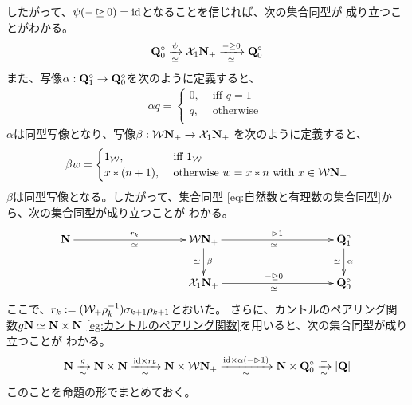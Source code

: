 	したがって、$\psi(-\unrhd0)=\id$となることを信じれば、次の集合同型が
	成り立つことがわかる。
	\begin{equation*}\begin{split}
		\bunsub[0] \xto[\simeq]{\psi} \mycal{X}_1\sizen_+\xto[\simeq]{-\unrhd0} \bunsub[0]
	\end{split}\end{equation*}
	また、写像$\alpha:\bunsub[1]\to\bunsub[0]$を次のように定義すると、
	\begin{equation*}\begin{split}
		\alpha q = \begin{cases}
			0, &\text{ iff } q = 1 \\
			q, &\text{ otherwise } \\
		\end{cases}
	\end{split}\end{equation*}
	$\alpha$は同型写像となり、写像$\beta:\Word\sizen_+\to\mycal{X}_1\sizen_+$
	を次のように定義すると、
	\begin{equation*}\begin{split}
		\beta w = \begin{cases}
			1_\Word, &\text{ iff } 1_\Word \\
			x * (n + 1), &\text{ otherwise } w = x * n
			\text{ with } x\in \Word\sizen_+ \\
		\end{cases}
	\end{split}\end{equation*}
	$\beta$は同型写像となる。したがって、集合同型
	\eqref{eq:自然数と有理数の集合同型}から、次の集合同型が成り立つことが
	わかる。
	\begin{equation*}\xymatrix@C=10em{
		\sizen \ar[r]^{r_k}_\simeq
			& \Word\sizen_+ \ar[d]^{\beta}_\simeq \ar[r]^{-\rhd1}_\simeq
			&  \bunsub[1]\ar[d]^{\alpha}_\simeq \\
		& \mycal{X}_1\sizen_+ \ar[r]^{-\unrhd0}_\simeq & \bunsub[0] \\
	}\end{equation*}
	ここで、$r_k:=(\Word_+\rho_k^{-1})\sigma_{k+1}\rho_{k+1}$とおいた。
	さらに、カントルのペアリング関数$g\sizen\simeq\sizen\times\sizen$
	\ref{eg:カントルのペアリング関数}を用いると、次の集合同型が成り立つことが
	わかる。
	\begin{equation*}\begin{split}
		\sizen \xto[\simeq]{g} \sizen\times\sizen
		\xto[\simeq]{\id\times r_k} \sizen\times\Word\sizen_+
		\xto[\simeq]{\id\times\alpha(-\rhd1)} \sizen\times\bunsub[0]
		\xto[\simeq]{+} |\bun|
	\end{split}\end{equation*}
	このことを命題の形でまとめておく。

